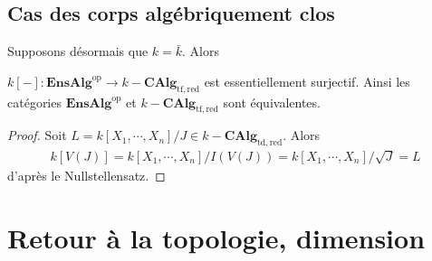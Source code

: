         \subsection{Cas des corps algébriquement clos}
            Supposons désormais que $k = \bar k$. Alors
            \begin{prop}
                $k[-] : \mathbf{EnsAlg}^\mathrm{op} \to k-\mathbf{CAlg}_\mathrm{tf, red}$ est essentiellement surjectif. Ainsi les catégories $\mathbf{EnsAlg}^\mathrm{op}$ et $k-\mathbf{CAlg}_\mathrm{tf, red}$ sont équivalentes.
            \end{prop}
            \begin{proof}
                Soit $L = k[X_1, \cdots, X_n]/J \in k-\mathbf{CAlg}_\mathrm{td, red}$. Alors
                \begin{align*}
                    k[V(J)] = k[X_1, \cdots, X_n]/I(V(J)) = k[X_1, \cdots, X_n]/\sqrt{J} = L
                \end{align*}
                d'après le Nullstellensatz.
            \end{proof}




    \section{Retour à la topologie, dimension}
